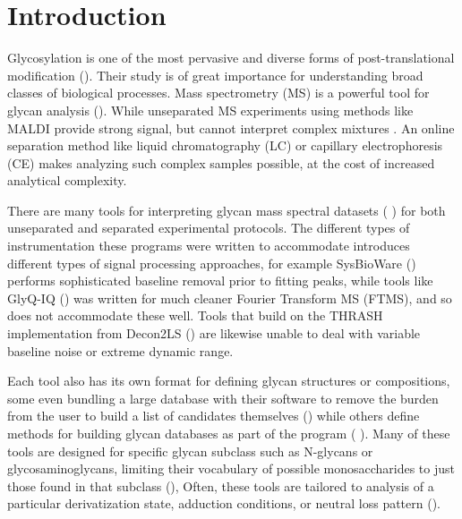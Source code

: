\section{Introduction}
Glycosylation is one of the most pervasive and diverse forms of
post-translational modification (\cite{Varki2017}). Their study
is of great importance for understanding broad classes of biological
processes. Mass spectrometry (MS) is a powerful tool for glycan
analysis (\cite{Zaia2008}). While unseparated MS experiments using
methods like MALDI provide strong signal, but cannot interpret complex
mixtures \cite{Peltoniemi2013}. An online separation method like liquid
chromatography (LC) or capillary electrophoresis (CE) makes analyzing
such complex samples possible, at the cost of increased analytical
complexity.

There are many tools for interpreting glycan mass spectral datasets (
\cite{Yu2013,Peltoniemi2013,Kronewitter2014,Goldberg2009,Maxwell2012,Ceroni2008,Frank2010})
for both unseparated and separated experimental protocols. The different types
of instrumentation these programs were written to accommodate introduces
different types of signal processing approaches, for example SysBioWare
(\cite{Frank2010}) performs sophisticated baseline removal prior to fitting
peaks, while tools like GlyQ-IQ (\cite{Kronewitter2014}) was written for much
cleaner Fourier Transform MS (FTMS), and so does not accommodate these well.
Tools that build on the THRASH implementation from Decon2LS (\cite{Jaitly2009,Yu2013,Maxwell2012})
are likewise unable to deal with variable baseline noise or extreme dynamic range.

Each tool also has its own format for defining glycan structures or compositions,
some even bundling a large database with their software to remove the burden from
the user to build a list of candidates themselves (\cite{Yu2013,Kronewitter2014,Goldberg2009})
while others define methods for building glycan databases as part of the program (
\cite{Maxwell2012,Ceroni2008}). Many of these tools are designed for specific glycan
subclass such as N-glycans or glycosaminoglycans, limiting their vocabulary of
possible monosaccharides to just those found in that subclass (\cite{Yu2013,Kronewitter2014,Peltoniemi2013,Goldberg2009}),
Often, these tools are tailored to analysis of a particular derivatization state,
adduction conditions, or neutral loss pattern (\cite{Yu2013,Peltoniemi2013,Maxwell2012}).

